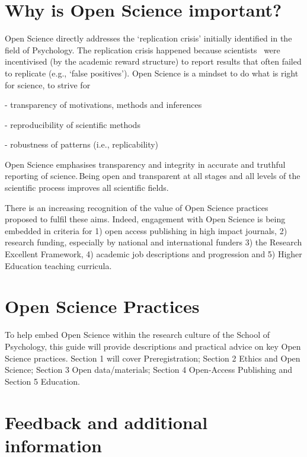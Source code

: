 \documentclass[
  letterpaper,
  DIV=11,
  numbers=noendperiod]{scrreprt}
\begin{document}
\hypertarget{why-is-open-science-important}{%
\section{Why is Open Science
important?~}\label{why-is-open-science-important}}

Open Science directly addresses the `replication crisis' initially
identified in the field of Psychology. The replication crisis happened
because scientists~ were incentivised (by the academic reward structure)
to report results that often failed to replicate (e.g., `false
positives'). Open Science is a mindset to do what is right for science,
to strive for~~

- transparency of motivations, methods and inferences~~

- reproducibility of scientific methods~~

- robustness of patterns (i.e., replicability)~

Open Science emphasises transparency and integrity in accurate and
truthful reporting of science.\,Being open and transparent at all stages
and all levels of the scientific process improves all scientific
fields.~~

There is an increasing recognition of the value of Open Science
practices proposed to fulfil these aims. Indeed, engagement with Open
Science is being embedded in criteria for 1) open access publishing in
high impact journals, 2) research funding, especially by national and
international funders 3) the Research Excellent Framework, 4) academic
job descriptions and progression and 5) Higher Education teaching
curricula.~

\hypertarget{open-science-practices}{%
\section{Open Science Practices~}\label{open-science-practices}}

To help embed Open Science within the research culture of the School of
Psychology, this guide will provide descriptions and practical advice on
key Open Science practices. Section 1 will cover Preregistration;
Section 2 Ethics and Open Science; Section 3 Open data/materials;
Section 4 Open-Access Publishing and Section 5 Education.~

\hypertarget{feedback-and-additional-information}{%
\section{Feedback and additional
information~}\label{feedback-and-additional-information}}
\end{document}
